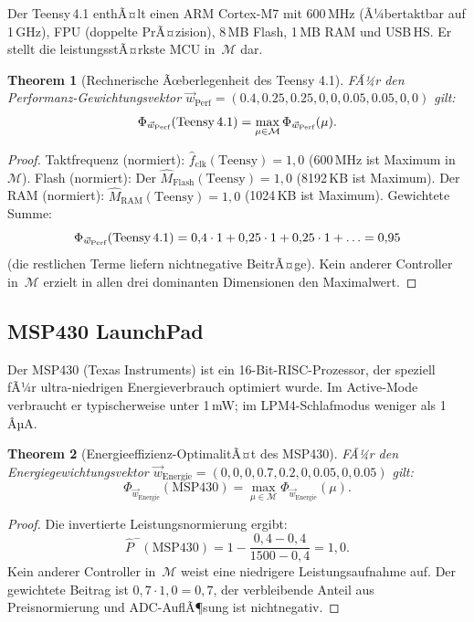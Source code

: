 ﻿\documentclass[12pt, a4paper]{article}
\theoremstyle{plain}
\newtheorem{theorem}{Theorem}[section]
\theoremstyle{definition}
\theoremstyle{remark}
\begin{document}
Der Teensy\,4.1 enthÃ¤lt einen ARM Cortex-M7 mit 600\,MHz (Ã¼bertaktbar auf
1\,GHz), FPU (doppelte PrÃ¤zision), 8\,MB Flash, 1\,MB RAM und USB\,HS.
Er stellt die leistungsstÃ¤rkste MCU in~$\mathcal{M}$ dar.

\begin{theorem}[Rechnerische Ãœberlegenheit des Teensy 4.1]
\label{thm:teensy_superior}
  FÃ¼r den Performanz-Ge\-wichtungsvektor
  $\vec{w}_\text{Perf} = (0.4, 0.25, 0.25, 0, 0, 0.05, 0.05, 0, 0)$
  gilt:
  \[
    \Phi_{\vec{w}_\text{Perf}}(\text{Teensy\,4.1}) =
    \max_{\mu \in \mathcal{M}} \Phi_{\vec{w}_\text{Perf}}(\mu).
  \]
\end{theorem}

\begin{proof}
  Taktfrequenz (normiert): $\hat{f}_\text{clk}(\text{Teensy}) = 1{,}0$
  (600\,MHz ist Maximum in~$\mathcal{M}$).
  Flash (normiert): Der $\hat{M}_\text{Flash}(\text{Teensy}) = 1{,}0$
  (8192\,KB ist Maximum).
  Der RAM (normiert): $\hat{M}_\text{RAM}(\text{Teensy}) = 1{,}0$
  (1024\,KB ist Maximum).
  Gewichtete Summe:
  \[
    \Phi_{\vec{w}_\text{Perf}}(\text{Teensy\,4.1}) =
    0{,}4 \cdot 1 + 0{,}25 \cdot 1 + 0{,}25 \cdot 1 + \ldots = 0{,}95
  \]
  (die restlichen Terme liefern nichtnegative BeitrÃ¤ge).
  Kein anderer Controller in~$\mathcal{M}$ erzielt in allen drei
  dominanten Dimensionen den Maximalwert.
\end{proof}

\subsection{MSP430 LaunchPad}

Der MSP430 (Texas Instruments) ist ein 16-Bit-RISC-Prozessor, der speziell fÃ¼r
ultra-niedrigen Energieverbrauch optimiert wurde.
Im Active-Mode verbraucht er typischerweise unter 1\,mW; im
LPM4-Schlafmodus weniger als 1\,ÂµA.

\begin{theorem}[Energieeffizienz-OptimalitÃ¤t des MSP430]
\label{thm:msp430_energie}
  FÃ¼r den Energiegewichtungsvektor
  $\vec{w}_\text{Energie} = (0, 0, 0, 0.7, 0.2, 0, 0.05, 0, 0.05)$
  gilt:
  \[
    \Phi_{\vec{w}_\text{Energie}}(\text{MSP430}) =
    \max_{\mu \in \mathcal{M}} \Phi_{\vec{w}_\text{Energie}}(\mu).
  \]
\end{theorem}

\begin{proof}
  Die invertierte Leistungsnormierung ergibt:
  \[
    \hat{P}^{-}(\text{MSP430}) = 1 - \frac{0{,}4 - 0{,}4}{1500 - 0{,}4} = 1{,}0.
  \]
  Kein anderer Controller in~$\mathcal{M}$ weist eine niedrigere
  Leistungsaufnahme auf.
  Der gewichtete Beitrag ist $0{,}7 \cdot 1{,}0 = 0{,}7$, der verbleibende
  Anteil aus Preisnormierung und ADC-AuflÃ¶sung ist nichtnegativ.
 
\end{proof}
\end{document}
